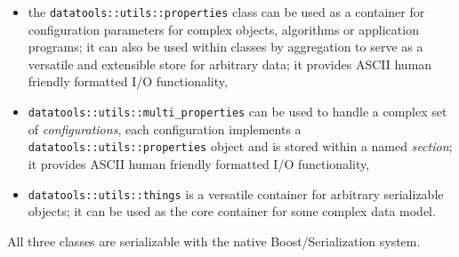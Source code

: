 \documentclass[a4paper,12pt]{article}
\begin{document}
\begin{itemize}

\item the \texttt{datatools::utils::properties} class can be used as a
  container   for  configuration   parameters  for   complex  objects,
  algorithms  or  application programs;  it  can  also  be used  within
  classes by aggregation to serve  as a versatile and extensible store
  for arbitrary  data; it provides ASCII human  friendly formatted I/O
  functionality,
  
\item  \texttt{datatools::utils::multi\_properties}  can  be  used  to
  handle  a complex set  of \emph{configurations},  each configuration
  implements  a  \texttt{datatools::utils::properties}  object and  is
  stored  within  a  named  \emph{section}; it  provides  ASCII  human
  friendly formatted I/O functionality,

\item \texttt{datatools::utils::things}  is a versatile  container for
  arbitrary serializable objects; it can be used as the core container
  for some complex data model.

\end{itemize}

All three classes are serializable with the native Boost/Serialization
system.
\end{document}
